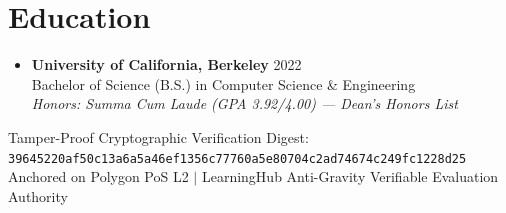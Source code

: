 \documentclass[letterpaper,10pt]{article}
\begin{document}
\section{Education}
\begin{itemize}[leftmargin=0.15in, label={}]
  \item
    \textbf{University of California, Berkeley} \hfill \small{2022} \\
    \small{Bachelor of Science (B.S.) in Computer Science \& Engineering}
    \\ \small{\textit{Honors: Summa Cum Laude (GPA 3.92/4.00) — Dean’s Honors List}}
\end{itemize}

\vfill
\begin{center}
  \footnotesize{\color{gray} Tamper-Proof Cryptographic Verification Digest: \texttt{39645220af50c13a6a5a46ef1356c77760a5e80704c2ad74674c249fc1228d25}} \\
  \footnotesize{\color{gray} Anchored on Polygon PoS L2 $|$ LearningHub Anti-Gravity Verifiable Evaluation Authority}
\end{center}
\end{document}
